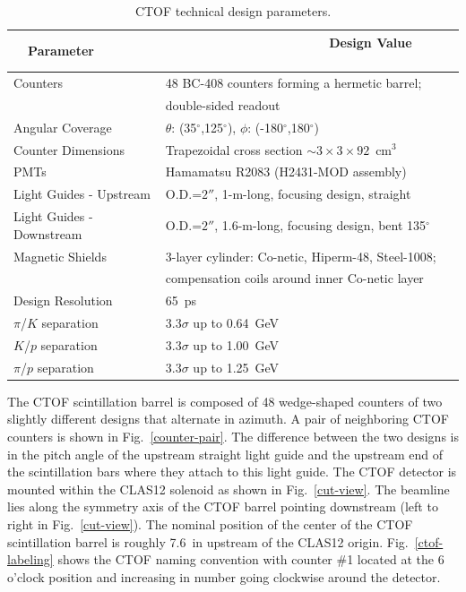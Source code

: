 \documentclass[12pt]{article}
\begin{document}
\begin{table}[htbp]
\begin{center}
\begin{tabular} {|l|l|} \hline
~~Parameter~~ &~~~~~~~~~~~~~~~~~~~~~~ Design Value ~~~~~~~~~~\\ \hline \hline
Counters                  & 48 BC-408 counters forming a hermetic barrel; \\
                          & double-sided readout                   \\ \hline
Angular Coverage          & $\theta$: (35$^\circ$,125$^\circ$), $\phi$: 
(-180$^\circ$,180$^\circ$) \\ \hline
Counter Dimensions        & Trapezoidal cross section $\sim 3 \times 3 \times 
92$~cm$^3$ \\ \hline
PMTs                      & Hamamatsu R2083 (H2431-MOD assembly)    \\ \hline
Light Guides - Upstream   & O.D.=$2''$, 1-m-long, focusing design, straight \\ \hline
Light Guides - Downstream & O.D.=$2''$, 1.6-m-long, focusing design, bent 135$^\circ$ \\ 
\hline
Magnetic Shields          & 3-layer cylinder: Co-netic, Hiperm-48, Steel-1008; \\ 
                          & compensation coils around inner Co-netic layer \\ \hline
Design Resolution         & 65~ps \\ \hline
$\pi$/$K$ separation      & 3.3$\sigma$ up to 0.64~GeV \\ \hline
$K$/$p$ separation        & 3.3$\sigma$ up to 1.00~GeV \\ \hline
$\pi$/$p$ separation      & 3.3$\sigma$ up to 1.25~GeV \\ \hline
\end{tabular}
\end{center}
\caption{CTOF technical design parameters.}
\label{details}
\end{table}

The CTOF scintillation barrel is composed of 48 wedge-shaped counters of two 
slightly different designs that alternate in azimuth. A pair of neighboring CTOF 
counters is shown in Fig.~\ref{counter-pair}. The difference between the two 
designs is in the pitch angle of the upstream straight light guide and the upstream 
end of the scintillation bars where they attach to this light guide. The CTOF 
detector is mounted within the CLAS12 solenoid as shown in Fig.~\ref{cut-view}. The 
beamline lies along the symmetry axis of the CTOF barrel pointing downstream (left 
to right in Fig.~\ref{cut-view}). The nominal position of the center of the CTOF
scintillation barrel is roughly 7.6~in upstream of the CLAS12 origin. 
Fig.~\ref{ctof-labeling} shows the CTOF naming convention with counter \#1 located 
at the 6 o'clock position and increasing in number going clockwise around the 
detector.
\end{document}
